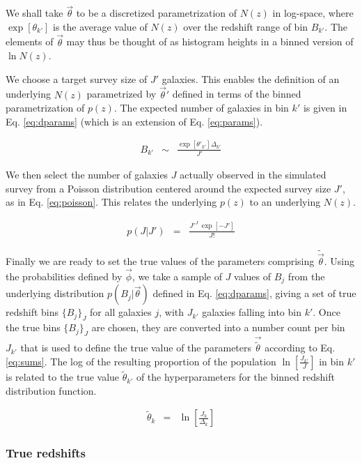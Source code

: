 \documentclass[preprint]{aastex}
\begin{document}
We shall take $\vec{\theta}$ to be a discretized parametrization of $N(z)$ in log-space, where $\exp[\theta_{k'}]$ is the average value of $N(z)$ over the redshift range of bin $B_{k'}$.   The elements of $\vec{\theta}$ may thus be thought of as histogram heights in a binned version of $\ln N(z)$.  

We choose a target survey size of $J'$ galaxies.  This enables the definition of an underlying $N(z)$  parametrized by $\vec{\theta}'$ defined in terms of the binned parametrization of $p(z)$.  The expected number of galaxies in bin $k'$ is given in Eq. \ref{eq:dparams} (which is an extension of Eq. \ref{eq:params}).  

\begin{eqnarray}
\label{eq:dparams}
B_{k'} &\sim& \frac{\exp[\theta'_{k'}]\Delta_{k'}}{J'}
\end{eqnarray}

We then select the number of galaxies $J$ actually observed in the simulated survey from a Poisson distribution centered around the expected survey size $J'$, as in Eq. \ref{eq:poisson}.  This relates the underlying $p(z)$ to an underlying $N(z)$.

\begin{eqnarray}
\label{eq:poisson}
p(J|J') &=& \frac{J'^{J}\ \exp[-J']}{J!}
\end{eqnarray}

Finally we are ready to set the true values of the parameters comprising $\tilde{\vec{\theta}}$.  Using the probabilities defined by $\vec{\phi}$, we take a sample of $J$ values of $B_{j}$ from the underlying distribution $p(B_{j}|\vec{\theta})$ defined in Eq. \ref{eq:dparams}, giving a set of true redshift bins $\{B_{j}\}_{J}$ for all galaxies $j$, with $J_{k'}$ galaxies falling into bin $k'$.  Once the true bins $\{B_{j}\}_{J}$ are chosen, they are converted into a number count per bin $J_{k'}$ that is used to define the true value of the parameters $\vec{\tilde{\theta}}$ according to Eq. \ref{eq:sums}.  The log of the resulting proportion of the population $\ln[\frac{J_{k'}}{J}]$ in bin $k'$ is related to the true value $\tilde{\theta}_{k'}$ of the hyperparameters for the binned redshift distribution function.

\begin{eqnarray}
\label{eq:sums}
\tilde{\theta}_{k} &=& \ln\left[\frac{J_{k}}{\Delta_{k}}\right]
\end{eqnarray}

\clearpage
\subsubsection{True redshifts}
\label{sec:z}
\end{document}
